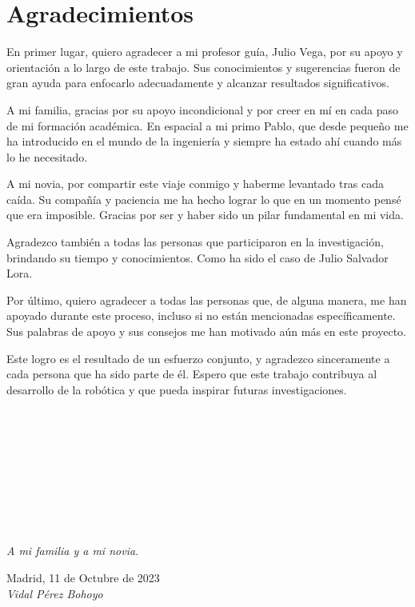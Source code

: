 \cleardoublepage

\chapter*{Agradecimientos}

\noindent En primer lugar, quiero agradecer a mi profesor guía, Julio Vega, por su apoyo y orientación a lo largo de este trabajo. Sus conocimientos y 
sugerencias fueron de gran ayuda para enfocarlo adecuadamente y alcanzar resultados significativos.

A mi familia, gracias por su apoyo incondicional y por creer en mí en cada paso de mi formación académica. En espacial a mi primo Pablo, que desde 
pequeño me ha introducido en el mundo de la ingeniería y siempre ha estado ahí cuando más lo he necesitado.

A mi novia, por compartir este viaje conmigo y haberme levantado tras cada caída. Su compañía y paciencia me ha hecho lograr lo que en un momento pensé 
que era imposible. Gracias por ser y haber sido un pilar fundamental en mi vida.

Agradezco también a todas las personas que participaron en la investigación, brindando su tiempo y conocimientos. Como ha sido el caso de Julio Salvador 
Lora.

Por último, quiero agradecer a todas las personas que, de alguna manera, me han apoyado durante este proceso, incluso si no están mencionadas 
específicamente. Sus palabras de apoyo y sus consejos me han motivado aún más en este proyecto.

Este logro es el resultado de un esfuerzo conjunto, y agradezco sinceramente a cada persona que ha sido parte de él. Espero que este 
trabajo contribuya al desarrollo de la robótica y que pueda inspirar futuras investigaciones.

\ %

\

\

\

\

\begin{flushright}
		\vspace{4.0 cm}
		\emph{A mi familia y a mi novia.}\\
		\par
		\vspace{1.0 cm}
		Madrid, 11 de Octubre de 2023\\ %
		\emph{Vidal Pérez Bohoyo}
\end{flushright}

\thispagestyle{empty}

